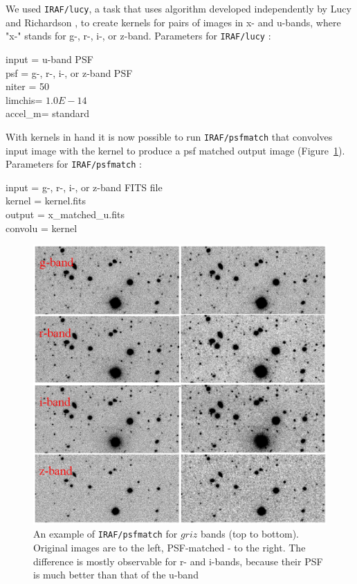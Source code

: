We used {\tt IRAF/lucy}, a task that uses algorithm developed independently by Lucy \citep{Lucy1974} and Richardson \citep{Richardson1972}, to create kernels for pairs of images in x- and u-bands, where "x-" stands for g-, r-, i-, or z-band. 
Parameters  for {\tt IRAF/lucy} :\\
\begin{tt}
input  = u-band PSF\\ 
psf    = g-, r-, i-, or z-band PSF\\ 
niter  =  50\\ 
limchis=  $1.0E-14$\\ 
accel\_m=  standard\\ 
	\end{tt}

With kernels in hand it is now possible to run {\tt IRAF/psfmatch} that convolves input image with the kernel to produce a psf matched output image (Figure~\ref{fig:psfmatch}). 
Parameters  for {\tt IRAF/psfmatch} :\\
\begin{tt}
input = g-, r-, i-, or z-band FITS  file\\ 
kernel = kernel.fits\\ 
output = x\_matched\_u.fits\\ 
convolu = kernel\\ 
	\end{tt}

\begin{figure}[!ht]
\includegraphics[width=6in]{Figures/psfmatch.png}
\caption{An example of {\tt IRAF/psfmatch} for $griz$ bands (top to bottom). Original images are to the left, PSF-matched - to the right. The difference is mostly observable for r- and i-bands, because their  PSF is much better than that of the u-band}
\label{fig:psfmatch}
\end{figure}


